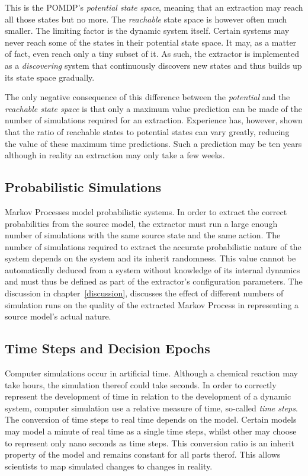 This is the POMDP's \textit{potential state space}, meaning that an extraction may reach all those states but no more. The \textit{reachable} state space is however often much smaller. The limiting factor is the dynamic system itself. Certain systems may never reach some of the states in their potential state space. It may, as a matter of fact, even reach only a tiny subset of it. As such, the extractor is implemented as a \textit{discovering} system that continuously discovers new states and thus builds up its state space gradually.

The only negative consequence of this difference between the \textit{potential} and the \textit{reachable state space} is that only a maximum value prediction can be made of the number of simulations required for an extraction. Experience has, however, shown that the ratio of reachable states to potential states can vary greatly, reducing the value of these maximum time predictions. Such a prediction may be ten years although in reality an extraction may only take a few weeks.

\subsection{Probabilistic Simulations}
\label{sec:probabilisticsimulation}

Markov Processes model probabilistic systems. In order to extract the correct probabilities from the source model, the extractor must run a large enough number of simulations with the same source state and the same action. The number of simulations required to extract the accurate probabilistic nature of the system depends on the system and its inherit randomness. This value cannot be automatically deduced from a system without knowledge of its internal dynamics and must thus be defined as part of the extractor's configuration parameters. The discussion in chapter~\ref{discussion}, discusses the effect of different numbers of simulation runs on the quality of the extracted Markov Process in representing a source model's actual nature.

\subsection{Time Steps and Decision Epochs}
\label{subsec:timestepsdecisionepochs}

Computer simulations occur in artificial time. Although a chemical reaction may take hours, the simulation thereof could take seconds. In order to correctly represent the development of time in relation to the development of a dynamic system, computer simulation use a relative measure of time, so-called \textit{time steps}. The conversion of time steps to real time depends on the model. Certain models may model a minute of real time as a single time steps, whilst other may choose to represent only nano seconds as time steps. This conversion ratio is an inherit property of the model and remains constant for all parts therof. This allows scientists to map simulated changes to changes in reality.

